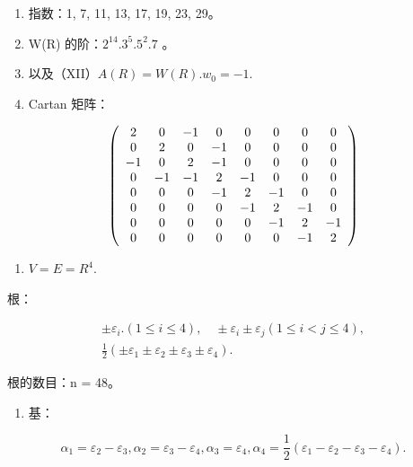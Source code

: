 \begin{enumerate}
\def\labelenumi{(\Roman{enumi})}
\setcounter{enumi}{8}
\item
  指数：1, 7, 11, 13, 17, 19, 23, 29。
\item
  W(R) 的阶：\(2^{14}.3^{5}.5^{2}.7\) 。
\item
  以及（XII）\(A(R) = W(R). w_0 = -1.\)
\item
  Cartan 矩阵：
\end{enumerate}

\[
\left( \begin{array}{c c c c c c c c} 2 & 0 & - 1 & 0 & 0 & 0 & 0 & 0 \\ 0 & 2 & 0 & - 1 & 0 & 0 & 0 & 0 \\ - 1 & 0 & 2 & - 1 & 0 & 0 & 0 & 0 \\ 0 & - 1 & - 1 & 2 & - 1 & 0 & 0 & 0 \\ 0 & 0 & 0 & - 1 & 2 & - 1 & 0 & 0 \\ 0 & 0 & 0 & 0 & - 1 & 2 & - 1 & 0 \\ 0 & 0 & 0 & 0 & 0 & - 1 & 2 & - 1 \\ 0 & 0 & 0 & 0 & 0 & 0 & - 1 & 2 \end{array} \right)
\]


\begin{enumerate}
\def\labelenumi{(\Roman{enumi})}
\tightlist
\item
  \(V = E = R^4.\)
\end{enumerate}

根：

\[
\begin{array}{c} \pm \varepsilon_ {i}. (1 \leqslant i \leqslant 4), \quad \pm \varepsilon_ {i} \pm \varepsilon_ {j} (1 \leqslant i <   j \leqslant 4), \\ \frac {1}{2} (\pm \varepsilon_ {1} \pm \varepsilon_ {2} \pm \varepsilon_ {3} \pm \varepsilon_ {4}). \end{array}
\]

根的数目：n = 48。

\begin{enumerate}
\def\labelenumi{(\Roman{enumi})}
\setcounter{enumi}{1}
\tightlist
\item
  基：
\end{enumerate}

\[
\alpha_ {1} = \varepsilon_ {2} - \varepsilon_ {3}, \alpha_ {2} = \varepsilon_ {3} - \varepsilon_ {4}, \alpha_ {3} = \varepsilon_ {4}, \alpha_ {4} = \frac {1}{2} (\varepsilon_ {1} - \varepsilon_ {2} - \varepsilon_ {3} - \varepsilon_ {4}).
\]

